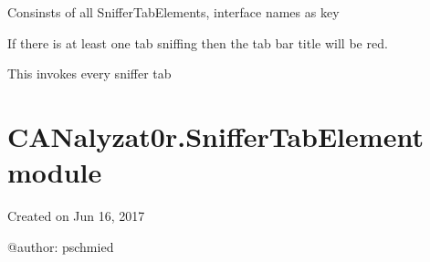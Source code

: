 \documentclass[letterpaper,10pt,english]{sphinxmanual}
\begin{document}
\begin{fulllineitems}
\begin{fulllineitems}
\begin{quote}
\begin{description}
\begin{itemize}
\end{itemize}

\end{description}\end{quote}

\end{fulllineitems}


\begin{fulllineitems}
\label{\detokenize{src:src.SnifferTab.SnifferTab.snifferTabs}}
Consinsts of all SnifferTabElements, interface names as key

\end{fulllineitems}


\begin{fulllineitems}
\label{\detokenize{src:src.SnifferTab.SnifferTab.toggleActive}}
If there is at least one tab sniffing then the tab bar title will be red.

\end{fulllineitems}


\begin{fulllineitems}
\label{\detokenize{src:src.SnifferTab.SnifferTab.updateInterfaceLabel}}
This invokes  every sniffer tab

\end{fulllineitems}


\end{fulllineitems}



\section{CANalyzat0r.SnifferTabElement module}
\label{\detokenize{src:module-src.SnifferTabElement}}\label{\detokenize{src:canalyzat0r-sniffertabelement-module}}
Created on Jun 16, 2017

@author: pschmied
\end{document}
